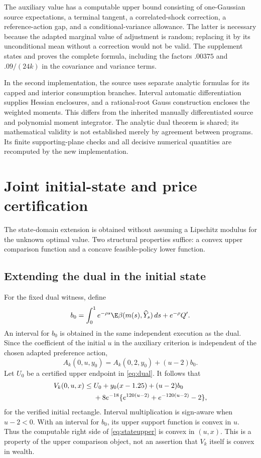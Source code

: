 The auxiliary value has a computable upper bound consisting of one-Gaussian source expectations, a terminal tangent, a correlated-shock correction, a reference-action gap, and a conditional-variance allowance. The latter is necessary because the adapted marginal value of adjustment is random; replacing it by its unconditional mean without a correction would not be valid. The supplement states and proves the complete formula, including the factors $.00375$ and $.09/(24k)$ in the covariance and variance terms.

In the second implementation, the source uses separate analytic formulas for its capped and interior consumption branches. Interval automatic differentiation supplies Hessian enclosures, and a rational-root Gauss construction encloses the weighted moments. This differs from the inherited manually differentiated source and polynomial moment integrator. The analytic dual theorem is shared; its mathematical validity is not established merely by agreement between programs. Its finite supporting-plane checks and all decisive numerical quantities are recomputed by the new implementation.

\section{Joint initial-state and price certification}\label{sec:state}
The state-domain extension is obtained without assuming a Lipschitz modulus for the unknown optimal value. Two structural properties suffice: a convex upper comparison function and a concave feasible-policy lower function.

\subsection{Extending the dual in the initial state}
For the fixed dual witness, define
\begin{equation}
 b_0=\int_0^1e^{-\rho s}\E\beta(m(s),\widehat Y_s)\,ds+e^{-\rho}Q'.
 \label{eq:b0}
\end{equation}
An interval for $b_0$ is obtained in the same independent execution as the dual. Since the coefficient of the initial $u$ in the auxiliary criterion is independent of the chosen adapted preference action,
\[
 A_k(0,u,y_0)=A_k(0,2,y_0)+(u-2)b_0.
\]
Let $U_0$ be a certified upper endpoint in \eqref{eq:dual}. It follows that
\begin{align}
 V_k(0,u,x)\leq{}& U_0+y_0(x-1.25)+(u-2)b_0\notag\\
 &+8e^{-18}\{e^{120(u-2)}+e^{-120(u-2)}-2\},\label{eq:stateupper}
\end{align}
for the verified initial rectangle. Interval multiplication is sign-aware when $u-2<0$. With an interval for $b_0$, its upper support function is convex in $u$. Thus the computable right side of \eqref{eq:stateupper} is convex in $(u,x)$. This is a property of the upper comparison object, not an assertion that $V_k$ itself is convex in wealth.

